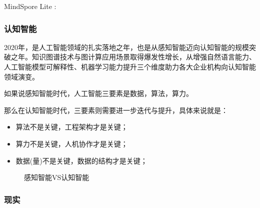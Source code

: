 \documentclass[letterpaper,10pt,english]{sphinxmanual}
\begin{document}
MindSpore Lite :


\subsubsection{认知智能}
\label{\detokenize{chapter_AI_dive/cognition_AI:id1}}\label{\detokenize{chapter_AI_dive/cognition_AI::doc}}
2020年，是人工智能领域的扎实落地之年，也是从感知智能迈向认知智能的规模突破之年。知识图谱技术与图计算应用场景取得爆发性增长，从增强自然语言能力、人工智能模型可解释性、机器学习能力提升三个维度助力各大企业机构向认知智能领域演变。%
\begin{footnote}[973]\sphinxAtStartFootnote
{}
%
\end{footnote}

如果说感知智能时代，人工智能三要素是数据，算法，算力。

那么在认知智能时代，三要素则需要进一步迭代与提升，具体来说就是：
\begin{itemize}
\item {} 
算法不是关键，工程架构才是关键；

\item {} 
算力不是关键，人机协作才是关键；

\item {} 
数据(量)不是关键，数据的结构才是关键；

\end{itemize}

\begin{figure}[H]
\centering
\capstart

\noindent{}
\caption{感知智能VS认知智能}\label{\detokenize{chapter_AI_dive/cognition_AI:id2}}\end{figure}


\subsubsection{现实}
\label{\detokenize{chapter_AI_dive/real:id1}}\label{\detokenize{chapter_AI_dive/real::doc}}
\end{document}
